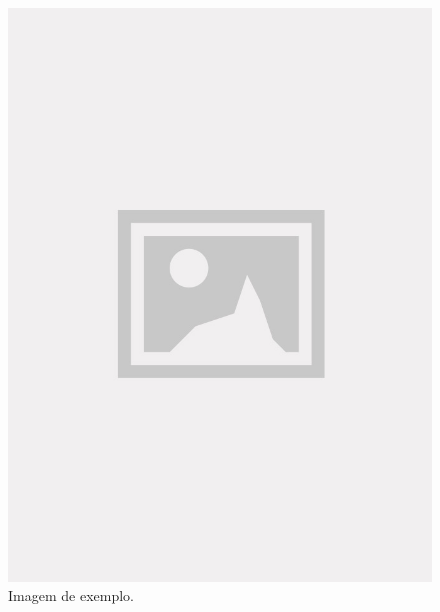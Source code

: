 \begin{figure}[!htb]
\centering
\caption{Imagem de exemplo.}
\includegraphics[width=\linewidth]{figuras/placeholder.jpg}
\end{figure}
